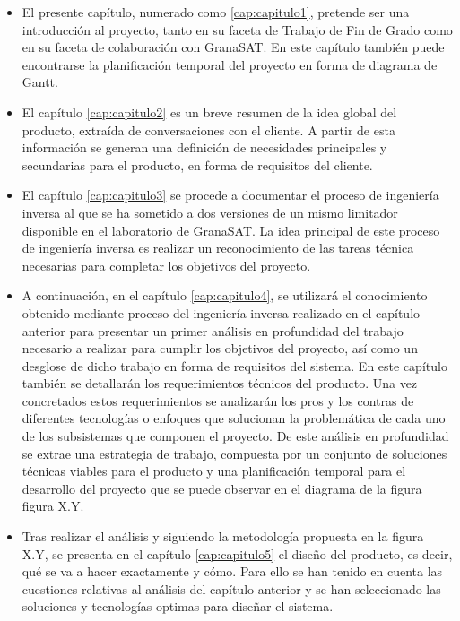 \begin{itemize}
    \item El presente capítulo, numerado como \ref{cap:capitulo1}, pretende ser una introducción al proyecto, tanto en su faceta de Trabajo de Fin de Grado como en su faceta de colaboración con GranaSAT. En este capítulo también puede encontrarse la planificación temporal del proyecto en forma de diagrama de Gantt.

    \item El capítulo \ref{cap:capitulo2} es un breve resumen de la idea global del producto, extraída de conversaciones con el cliente. A partir de esta información se generan una definición de necesidades principales y secundarias para el producto, en forma de requisitos del cliente.

    \item El capítulo \ref{cap:capitulo3} se procede a documentar el proceso de ingeniería inversa al que se ha sometido a dos versiones de un mismo limitador disponible en el laboratorio de GranaSAT. La idea principal de este proceso de ingeniería inversa es realizar un reconocimiento de las tareas técnica necesarias para completar los objetivos del proyecto.

    \item A continuación, en el capítulo \ref{cap:capitulo4}, se utilizará el conocimiento obtenido mediante proceso del ingeniería inversa realizado en el capítulo anterior para presentar un primer análisis en profundidad del trabajo necesario a realizar para cumplir los objetivos del proyecto, así como un desglose de dicho trabajo en forma de requisitos del sistema. En este capítulo también se detallarán los requerimientos técnicos del producto. Una vez concretados estos requerimientos se analizarán los pros y los contras de diferentes tecnologías o enfoques que solucionan la problemática de cada uno de los subsistemas que componen el proyecto. De este análisis en profundidad se extrae una estrategia de trabajo, compuesta por un conjunto de soluciones técnicas viables para el producto y una planificación temporal para el desarrollo del proyecto que se puede observar en el diagrama de la figura figura X.Y.

    \item Tras realizar el análisis y siguiendo la metodología propuesta en la figura X.Y, se presenta en el capítulo \ref{cap:capitulo5} el diseño del producto, es decir, qué se va a hacer exactamente y cómo. Para ello se han tenido en cuenta las cuestiones relativas al análisis del capítulo anterior y se han seleccionado las soluciones y tecnologías optimas para diseñar el sistema.


\end{itemize}
